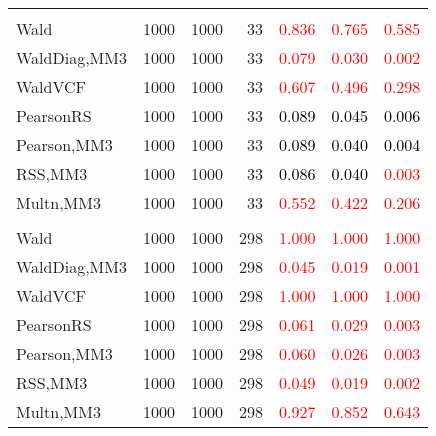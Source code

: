 \documentclass[
]{article}
\begin{document}
\begin{table}[H]
{\begin{tabular}[t]{lrrrrrr}
\addlinespace[0.3em]
\multicolumn{7}{l}{\textbf{2F 10V}}\\
\hspace{1em}Wald & 1000 & 1000 & 33 & \textcolor{red}{0.836} & \textcolor{red}{0.765} & \textcolor{red}{0.585}\\
\hspace{1em}WaldDiag,MM3 & 1000 & 1000 & 33 & \textcolor{red}{0.079} & \textcolor{red}{0.030} & \textcolor{red}{0.002}\\
\hspace{1em}WaldVCF & 1000 & 1000 & 33 & \textcolor{red}{0.607} & \textcolor{red}{0.496} & \textcolor{red}{0.298}\\
\hspace{1em}PearsonRS & 1000 & 1000 & 33 & \textcolor{black}{0.089} & \textcolor{black}{0.045} & \textcolor{black}{0.006}\\
\hspace{1em}Pearson,MM3 & 1000 & 1000 & 33 & \textcolor{black}{0.089} & \textcolor{black}{0.040} & \textcolor{black}{0.004}\\
\hspace{1em}RSS,MM3 & 1000 & 1000 & 33 & \textcolor{black}{0.086} & \textcolor{black}{0.040} & \textcolor{red}{0.003}\\
\hspace{1em}Multn,MM3 & 1000 & 1000 & 33 & \textcolor{red}{0.552} & \textcolor{red}{0.422} & \textcolor{red}{0.206}\\
\addlinespace[0.3em]
\multicolumn{7}{l}{\textbf{3F 15V}}\\
\hspace{1em}Wald & 1000 & 1000 & 298 & \textcolor{red}{1.000} & \textcolor{red}{1.000} & \textcolor{red}{1.000}\\
\hspace{1em}WaldDiag,MM3 & 1000 & 1000 & 298 & \textcolor{red}{0.045} & \textcolor{red}{0.019} & \textcolor{red}{0.001}\\
\hspace{1em}WaldVCF & 1000 & 1000 & 298 & \textcolor{red}{1.000} & \textcolor{red}{1.000} & \textcolor{red}{1.000}\\
\hspace{1em}PearsonRS & 1000 & 1000 & 298 & \textcolor{red}{0.061} & \textcolor{red}{0.029} & \textcolor{red}{0.003}\\
\hspace{1em}Pearson,MM3 & 1000 & 1000 & 298 & \textcolor{red}{0.060} & \textcolor{red}{0.026} & \textcolor{red}{0.003}\\
\hspace{1em}RSS,MM3 & 1000 & 1000 & 298 & \textcolor{red}{0.049} & \textcolor{red}{0.019} & \textcolor{red}{0.002}\\
\hspace{1em}Multn,MM3 & 1000 & 1000 & 298 & \textcolor{red}{0.927} & \textcolor{red}{0.852} & \textcolor{red}{0.643}\\
\bottomrule
\end{tabular}}
\endgroup{}
\end{table}
\end{document}
